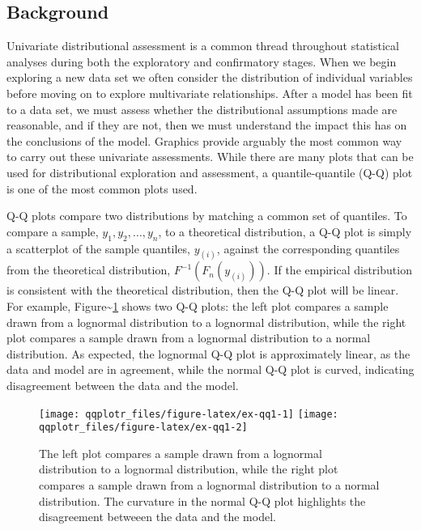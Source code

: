 \subsection{Background}\label{background}

\label{sec:background}

Univariate distributional assessment is a common thread throughout
statistical analyses during both the exploratory and confirmatory
stages. When we begin exploring a new data set we often consider the
distribution of individual variables before moving on to explore
multivariate relationships. After a model has been fit to a data set, we
must assess whether the distributional assumptions made are reasonable,
and if they are not, then we must understand the impact this has on the
conclusions of the model. Graphics provide arguably the most common way
to carry out these univariate assessments. While there are many plots
that can be used for distributional exploration and assessment, a
quantile-quantile (Q-Q) plot \citep{Wilk1968-ii} is one of the most
common plots used.

Q-Q plots compare two distributions by matching a common set of
quantiles. To compare a sample, \(y_1, y_2, \ldots, y_n\), to a
theoretical distribution, a Q-Q plot is simply a scatterplot of the
sample quantiles, \(y_{(i)}\), against the corresponding quantiles from
the theoretical distribution, \(F^{-1}\left( F_n(y_{(i)}) \right)\). If
the empirical distribution is consistent with the theoretical
distribution, then the Q-Q plot will be linear. For example,
Figure\textasciitilde{}\ref{fig:ex-qq1} shows two Q-Q plots: the left
plot compares a sample drawn from a lognormal distribution to a
lognormal distribution, while the right plot compares a sample drawn
from a lognormal distribution to a normal distribution. As expected, the
lognormal Q-Q plot is approximately linear, as the data and model are in
agreement, while the normal Q-Q plot is curved, indicating disagreement
between the data and the model.

\begin{Schunk}
\begin{figure}

{\centering \texttt{[image: qqplotr\_files/figure-latex/ex-qq1-1]} \texttt{[image: qqplotr\_files/figure-latex/ex-qq1-2]} 

}

\caption[The left plot compares a sample drawn from a lognormal distribution to a lognormal distribution, while the right plot compares a sample drawn from a lognormal distribution to a normal distribution]{The left plot compares a sample drawn from a lognormal distribution to a lognormal distribution, while the right plot compares a sample drawn from a lognormal distribution to a normal distribution. The curvature in the normal Q-Q plot highlights the disagreement betweeen the data and the model.}\label{fig:ex-qq1}
\end{figure}
\end{Schunk}

